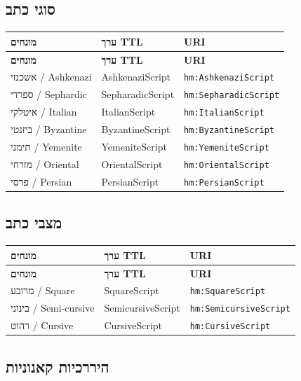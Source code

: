 \documentclass[12pt,a4paper]{article}
\newcommand{\ttlprop}[1]{\texttt{#1}}
\begin{document}
\subsection{סוגי כתב}

\begin{longtable}{|p{4cm}|L{5cm}|L{7cm}|}
\hline
\textbf{מונחים} & \textbf{ערך TTL} & \textbf{URI} \\
\hline
\endfirsthead
\hline
\textbf{מונחים} & \textbf{ערך TTL} & \textbf{URI} \\
\hline
\endhead
\hline
\endfoot
אשכנזי / Ashkenazi & AshkenaziScript & \ttlprop{hm:AshkenaziScript} \\
\hline
ספרדי / Sephardic & SepharadicScript & \ttlprop{hm:SepharadicScript} \\
\hline
איטלקי / Italian & ItalianScript & \ttlprop{hm:ItalianScript} \\
\hline
ביזנטי / Byzantine & ByzantineScript & \ttlprop{hm:ByzantineScript} \\
\hline
תימני / Yemenite & YemeniteScript & \ttlprop{hm:YemeniteScript} \\
\hline
מזרחי / Oriental & OrientalScript & \ttlprop{hm:OrientalScript} \\
\hline
פרסי / Persian & PersianScript & \ttlprop{hm:PersianScript} \\
\hline
\end{longtable}

\subsection{מצבי כתב}

\begin{longtable}{|p{4cm}|L{5cm}|L{7cm}|}
\hline
\textbf{מונחים} & \textbf{ערך TTL} & \textbf{URI} \\
\hline
\endfirsthead
\hline
\textbf{מונחים} & \textbf{ערך TTL} & \textbf{URI} \\
\hline
\endhead
\hline
\endfoot
מרובע / Square & SquareScript & \ttlprop{hm:SquareScript} \\
\hline
בינוני / Semi-cursive & SemicursiveScript & \ttlprop{hm:SemicursiveScript} \\
\hline
רהוט / Cursive & CursiveScript & \ttlprop{hm:CursiveScript} \\
\hline
\end{longtable}

\subsection{היררכיות קאנוניות}
\end{document}
